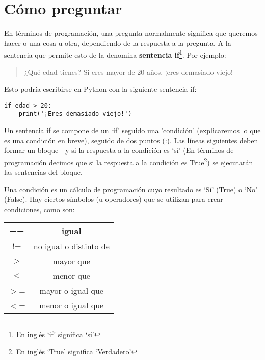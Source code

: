 

\chapter{Cómo preguntar}\label{ch:howtoaskaquestion}

En términos de programación, una pregunta normalmente significa que queremos hacer o una cosa u otra, dependiendo de la respuesta a la pregunta.  A la sentencia que permite esto de la denomina \textbf{sentencia if}\footnote{En inglés `if' significa `si'}.  Por ejemplo:

\begin{quotation}
¿Qué edad tienes?  Si eres mayor de 20 años, ¡eres demasiado viejo!
\end{quotation}

Esto podría escribirse en Python con la siguiente sentencia if:

\begin{listing}
\begin{verbatim}
if edad > 20:
    print('¡Eres demasiado viejo!')
\end{verbatim}
\end{listing}

Un sentencia if se compone de un `if' seguido una 'condición' (explicaremos lo que es una condición en breve), seguido de dos puntos (:).  Las líneas siguientes deben formar un bloque---y si la respuesta a la condición es `sí' (En términos de programación decimos que si la respuesta a la condición es True\footnote{En inglés `True' significa `Verdadero'}) se ejecutarán las sentencias del bloque.
\par
Una condición es un cálculo de programación cuyo resultado es `Sí' (True) o `No' (False).  Hay ciertos símbolos (u operadores) que se utilizan para crear condiciones, como son:

\begin{center}
\begin{tabular}{|c|c|}
\hline
== & igual \\
\hline
!= & no igual o distinto de \\
\hline
$>$ & mayor que \\
\hline
$<$ & menor que \\
\hline
$>$= & mayor o igual que \\
\hline
$<$= & menor o igual que \\
\hline
\end{tabular}
\end{center}

